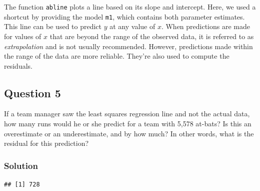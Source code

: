 \documentclass[]{article}
\newenvironment{Shaded}{\begin{snugshade}}{\end{snugshade}}
\newcommand{\KeywordTok}[1]{\textcolor[rgb]{0.13,0.29,0.53}{\textbf{#1}}}
\newcommand{\DecValTok}[1]{\textcolor[rgb]{0.00,0.00,0.81}{#1}}
\newcommand{\StringTok}[1]{\textcolor[rgb]{0.31,0.60,0.02}{#1}}
\newcommand{\OperatorTok}[1]{\textcolor[rgb]{0.81,0.36,0.00}{\textbf{#1}}}
\newcommand{\NormalTok}[1]{#1}
\begin{document}
The function \texttt{abline} plots a line based on its slope and
intercept. Here, we used a shortcut by providing the model \texttt{m1},
which contains both parameter estimates. This line can be used to
predict \(y\) at any value of \(x\). When predictions are made for
values of \(x\) that are beyond the range of the observed data, it is
referred to as \emph{extrapolation} and is not usually recommended.
However, predictions made within the range of the data are more
reliable. They're also used to compute the residuals.

\subsection{Question 5}\label{question-5}

If a team manager saw the least squares regression line and not the
actual data, how many runs would he or she predict for a team with 5,578
at-bats? Is this an overestimate or an underestimate, and by how much?
In other words, what is the residual for this prediction?

\subsubsection{Solution}\label{solution-4}

\begin{Shaded}
\end{Shaded}

\begin{verbatim}
## [1] 728
\end{verbatim}

\begin{Shaded}
\end{Shaded}
\end{document}
